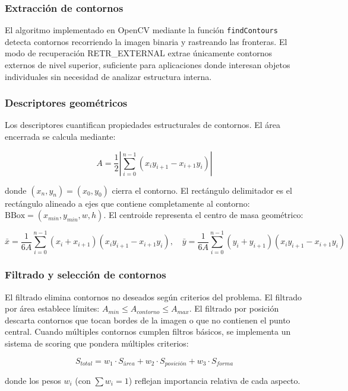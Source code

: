 \subsubsection{Extracción de contornos}

El algoritmo implementado en OpenCV mediante la función \texttt{findContours} detecta contornos recorriendo la imagen binaria y rastreando las fronteras. El modo de recuperación RETR\_EXTERNAL extrae únicamente contornos externos de nivel superior, suficiente para aplicaciones donde interesan objetos individuales sin necesidad de analizar estructura interna.

\subsubsection{Descriptores geométricos}

Los descriptores cuantifican propiedades estructurales de contornos. El área encerrada se calcula mediante:

\begin{equation}
A = \frac{1}{2}\left|\sum_{i=0}^{n-1}(x_i y_{i+1} - x_{i+1}y_i)\right|
\end{equation}

donde $(x_n, y_n) = (x_0, y_0)$ cierra el contorno. El rectángulo delimitador es el rectángulo alineado a ejes que contiene completamente al contorno: $\text{BBox} = (x_{min}, y_{min}, w, h)$. El centroide representa el centro de masa geométrico:

\begin{equation}
\bar{x} = \frac{1}{6A}\sum_{i=0}^{n-1}(x_i + x_{i+1})(x_i y_{i+1} - x_{i+1}y_i), \quad \bar{y} = \frac{1}{6A}\sum_{i=0}^{n-1}(y_i + y_{i+1})(x_i y_{i+1} - x_{i+1}y_i)
\end{equation}

\subsubsection{Filtrado y selección de contornos}

El filtrado elimina contornos no deseados según criterios del problema. El filtrado por área establece límites: $A_{min} \leq A_{contorno} \leq A_{max}$. El filtrado por posición descarta contornos que tocan bordes de la imagen o que no contienen el punto central. Cuando múltiples contornos cumplen filtros básicos, se implementa un sistema de scoring que pondera múltiples criterios:

\begin{equation}
S_{total} = w_1 \cdot S_{área} + w_2 \cdot S_{posición} + w_3 \cdot S_{forma}
\end{equation}

donde los pesos $w_i$ (con $\sum w_i = 1$) reflejan importancia relativa de cada aspecto.
